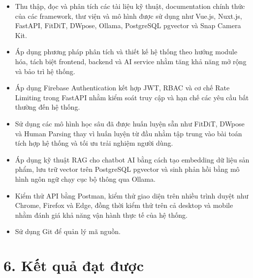 \begin{itemize}
    \item Thu thập, đọc và phân tích các tài liệu kỹ thuật, documentation chính thức của các framework, thư viện và mô hình được sử dụng như Vue.js, Nuxt.js, FastAPI, FitDiT, DWpose, Ollama, PostgreSQL pgvector và Snap Camera Kit.
    
    \item Áp dụng phương pháp phân tích và thiết kế hệ thống theo hướng module hóa, tách biệt frontend, backend và AI service nhằm tăng khả năng mở rộng và bảo trì hệ thống.
    
    \item Áp dụng Firebase Authentication kết hợp JWT, RBAC và cơ chế Rate Limiting trong FastAPI nhằm kiểm soát truy cập và hạn chế các yêu cầu bất thường đến hệ thống.    \item Sử dụng các mô hình học sâu đã được huấn luyện sẵn như FitDiT, DWpose và Human Parsing thay vì huấn luyện từ đầu nhằm tập trung vào bài toán tích hợp hệ thống và tối ưu trải nghiệm người dùng.
    
    \item Áp dụng kỹ thuật RAG cho chatbot AI bằng cách tạo embedding dữ liệu sản phẩm, lưu trữ vector trên PostgreSQL pgvector và sinh phản hồi bằng mô hình ngôn ngữ chạy cục bộ thông qua Ollama.
    
    \item Kiểm thử API bằng Postman, kiểm thử giao diện trên nhiều trình duyệt như Chrome, Firefox và Edge, đồng thời kiểm thử trên cả desktop và mobile nhằm đánh giá khả năng vận hành thực tế của hệ thống.
    
    \item Sử dụng Git để quản lý mã nguồn.
\end{itemize}

\section*{6. Kết quả đạt được}

